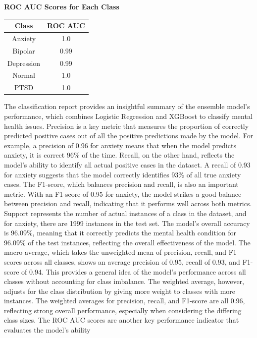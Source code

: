 \begin{center}
    \textbf{ROC AUC Scores for Each Class} \\[0.5em]
    \begin{tabular}{|c|c|}
        \hline
        \textbf{Class} & \textbf{ROC AUC} \\ \hline
        Anxiety  & 1.0 \\ \hline
        Bipolar  & 0.99 \\ \hline
        Depression & 0.99 \\ \hline
        Normal   & 1.0 \\ \hline
        PTSD     & 1.0 \\ \hline
    \end{tabular}
\end{center}

\noindent
The classification report provides an insightful summary of the ensemble model's performance, which combines Logistic Regression and XGBoost to classify mental health issues. Precision is a key metric that measures the proportion of correctly predicted positive cases out of all the positive predictions made by the model. For example, a precision of 0.96 for anxiety means that when the model predicts anxiety, it is correct 96\% of the time. Recall, on the other hand, reflects the model's ability to identify all actual positive cases in the dataset. A recall of 0.93 for anxiety suggests that the model correctly identifies 93\% of all true anxiety cases. The F1-score, which balances precision and recall, is also an important metric. With an F1-score of 0.95 for anxiety, the model strikes a good balance between precision and recall, indicating that it performs well across both metrics. Support represents the number of actual instances of a class in the dataset, and for anxiety, there are 1999 instances in the test set. The model's overall accuracy is 96.09\%, meaning that it correctly predicts the mental health condition for 96.09\% of the test instances, reflecting the overall effectiveness of the model. The macro average, which takes the unweighted mean of precision, recall, and F1-scores across all classes, shows an average precision of 0.95, recall of 0.93, and F1-score of 0.94. This provides a general idea of the model's performance across all classes without accounting for class imbalance. The weighted average, however, adjusts for the class distribution by giving more weight to classes with more instances. The weighted averages for precision, recall, and F1-score are all 0.96, reflecting strong overall performance, especially when considering the differing class sizes. The ROC AUC scores are another key performance indicator that evaluates the model's ability 

